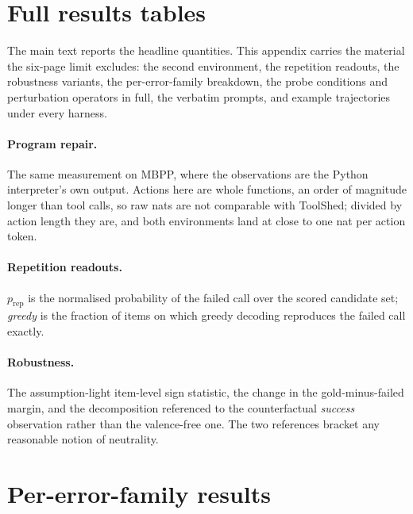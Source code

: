 \section{Full results tables}
\label{app:ws-full}

The main text reports the headline quantities. This appendix carries the
material the six-page limit excludes: the second environment, the repetition
readouts, the robustness variants, the per-error-family breakdown, the probe
conditions and perturbation operators in full, the verbatim prompts, and
example trajectories under every harness.

\paragraph{Program repair.}
The same measurement on MBPP, where the observations are the Python
interpreter's own output. Actions here are whole functions, an order of
magnitude longer than tool calls, so raw nats are not comparable with
ToolShed; divided by action length they are, and both environments land at
close to one nat per action token.



\paragraph{Repetition readouts.}
$p_{\text{rep}}$ is the normalised probability of the failed call over the
scored candidate set; \emph{greedy} is the fraction of items on which greedy
decoding reproduces the failed call exactly.





\paragraph{Robustness.}
The assumption-light item-level sign statistic, the change in the
gold-minus-failed margin, and the decomposition referenced to the counterfactual
\emph{success} observation rather than the valence-free one. The two references
bracket any reasonable notion of neutrality.



\section{Per-error-family results}
\label{app:ws-by-error}

